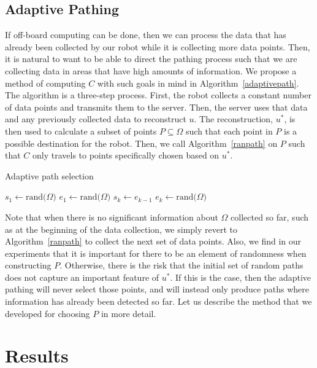\documentclass[english]{article}\usepackage[]{graphicx}\usepackage[]{color}
\begin{document}
\subsection{Adaptive Pathing}

If off-board computing can be done, then we can process the data that has already been collected by our robot while it is collecting 
more data points. Then, it is natural to want to be able to direct the pathing process such that we are collecting data in areas that 
have high amounts of information. We propose a method of computing $C$ with such goals in mind in Algorithm~\ref{adaptivepath}. The 
algorithm is a three-step process. First, the robot collects a constant number of data points and transmits them to the server. Then, 
the server uses that data and any previously collected data to reconstruct $u$. The reconstruction, $u^*$, is then used to calculate 
a subset of points $P\subseteq\Omega$ such that each point in $P$ is a possible destination for the robot. Then, we call Algorithm~\ref{ranpath} on $P$ such that $C$ only travels to points specifically chosen based on $u^*$.

\begin{algorithm}[H]
\caption{Adaptive path selection}\label{adaptivepath}
\begin{algorithmic}[1]
\State $s_1\gets \text{rand(}\Omega)$
\State $e_1\gets \text{rand(}\Omega)$
\State $s_k\gets e_{k-1}$
\State $e_k\gets \text{rand(}\Omega)$
\EndFor
\EndProcedure
\end{algorithmic}
\end{algorithm}

Note that when there is no significant information about $\Omega$ collected so far, such as at the beginning of the data collection, 
we simply revert to Algorithm~\ref{ranpath} to collect the next set of data points. Also, we find in our experiments that it is 
important for there to be an element of randomness when constructing $P$. Otherwise, there is the risk that the initial set of random 
paths does not capture an important feature of $u^*$. If this is the case, then the adaptive pathing will never select those points, and will instead only produce paths where information has already been detected so far. Let us describe the method that we developed  
for choosing $P$ in more detail.


\section{Results}
\end{document}
